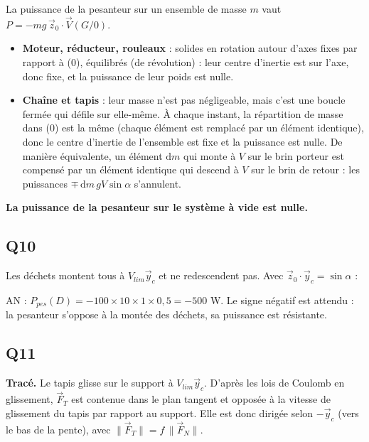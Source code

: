 \documentclass[11pt,a4paper]{article}
\providecommand{\tightlist}{\setlength{\itemsep}{0pt}\setlength{\parskip}{0pt}}
\newcommand{\equationajustee}[1]{%
  \sbox{\boiteequation}{$\displaystyle #1$}%
  \ifdim\wd\boiteequation>\linewidth
    \[\resizebox{\linewidth}{!}{\usebox{\boiteequation}}\]%
  \else
    \[#1\]%
  \fi}
\begin{document}
La puissance de la pesanteur sur un ensemble de masse \(m\) vaut \(P=-mg\,\vec z_0\cdot\vec V(G/0)\).

\begin{itemize}
\tightlist
\item
  \textbf{Moteur, réducteur, rouleaux} : solides en rotation autour d'axes fixes par rapport à (0), équilibrés (de révolution) : leur centre d'inertie est sur l'axe, donc fixe, et la puissance de leur poids est nulle.
\item
  \textbf{Chaîne et tapis} : leur masse n'est pas négligeable, mais c'est une boucle fermée qui défile sur elle-même. À chaque instant, la répartition de masse dans (0) est la même (chaque élément est remplacé par un élément identique), donc le centre d'inertie de l'ensemble est fixe et la puissance est nulle. De manière équivalente, un élément \(\mathrm dm\) qui monte à \(V\) sur le brin porteur est compensé par un élément identique qui descend à \(V\) sur le brin de retour : les puissances \(\mp\,\mathrm dm\,gV\sin\alpha\) s'annulent.
\end{itemize}

\textbf{La puissance de la pesanteur sur le système à vide est nulle.}

\hypertarget{q10}{%
\subsection{Q10}\label{q10}}

Les déchets montent tous à \(V_{lim}\vec y_c\) et ne redescendent pas. Avec \(\vec z_0\cdot\vec y_c=\sin\alpha\) :

\equationajustee{P_{pes}(D)=(-M_Dg\,\vec z_0)\cdot(V_{lim}\vec y_c)}

\equationajustee{\boxed{P_{pes}(D)=-M_D\,g\,V_{lim}\sin\alpha}}

AN : \(P_{pes}(D)=-100\times10\times1\times0{,}5=-500\) W. Le signe négatif est attendu : la pesanteur s'oppose à la montée des déchets, sa puissance est résistante.

\hypertarget{q11}{%
\subsection{Q11}\label{q11}}

\textbf{Tracé.} Le tapis glisse sur le support à \(V_{lim}\vec y_c\). D'après les lois de Coulomb en glissement, \(\vec F_T\) est contenue dans le plan tangent et opposée à la vitesse de glissement du tapis par rapport au support. Elle est donc dirigée selon \(-\vec y_c\) (vers le bas de la pente), avec \(\|\vec F_T\|=f\,\|\vec F_N\|\).
\end{document}
